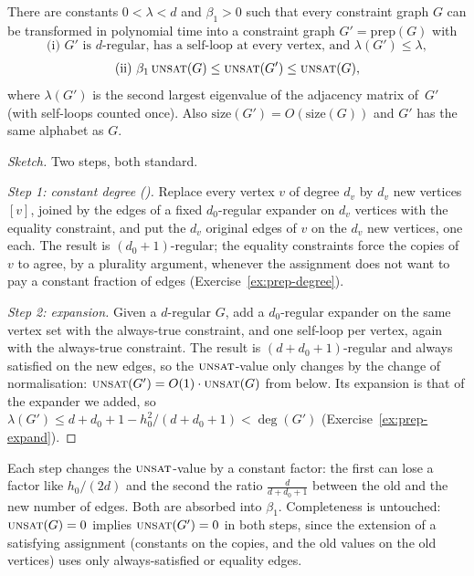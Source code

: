 \begin{lemma}\label{lem:prep}
There are constants $0<\lambda<d$ and $\beta_1>0$ such that every constraint graph $G$ can be transformed in polynomial time into a constraint graph $G'=\mathrm{prep}(G)$ with
\[
  \text{(i) } G'\text{ is }d\text{-regular, has a self-loop at every vertex, and }\lambda(G')\le\lambda,
\]
\[
  \text{(ii) } \beta_1\,\textsc{unsat}(G)\le\textsc{unsat}(G')\le\textsc{unsat}(G),
\]
where $\lambda(G')$ is the second largest eigenvalue of the adjacency matrix of~$G'$ (with self-loops counted once).  Also $\mathrm{size}(G')=O(\mathrm{size}(G))$ and $G'$ has the same alphabet as $G$.
\end{lemma}

\begin{proof}[Sketch]
Two steps, both standard.

\emph{Step 1: constant degree (\citet{PapadimitriouYannakakis91}).}  Replace every vertex $v$ of degree $d_v$ by $d_v$ new vertices $[v]$, joined by the edges of a fixed $d_0$-regular expander on $d_v$ vertices with the equality constraint, and put the $d_v$ original edges of $v$ on the $d_v$ new vertices, one each.  The result is $(d_0+1)$-regular; the equality constraints force the copies of $v$ to agree, by a plurality argument, whenever the assignment does not want to pay a constant fraction of edges (Exercise~\ref{ex:prep-degree}).

\emph{Step 2: expansion.}  Given a $d$-regular $G$, add a $d_0$-regular expander on the same vertex set with the always-true constraint, and one self-loop per vertex, again with the always-true constraint.  The result is $(d+d_0+1)$-regular and always satisfied on the new edges, so the $\textsc{unsat}$-value only changes by the change of normalisation: $\textsc{unsat}(G')=O(1)\cdot\textsc{unsat}(G)$ from below.
Its expansion is that of the expander we added, so $\lambda(G')\le d+d_0+1-h_0^2/(d+d_0+1)<\deg(G')$ (Exercise~\ref{ex:prep-expand}).
\end{proof}

\begin{remark}\label{rem:prep-losses}
Each step changes the $\textsc{unsat}$-value by a constant factor:
the first can lose a factor like $h_0/(2d)$ and the second the ratio $\frac{d}{d+d_0+1}$ between the old and the new number of edges.  Both are absorbed into $\beta_1$.
Completeness is untouched: $\textsc{unsat}(G)=0$ implies $\textsc{unsat}(G')=0$ in both steps, since the extension of a satisfying assignment (constants on the copies, and the old values on the old vertices) uses only always-satisfied or equality edges.
\end{remark}


